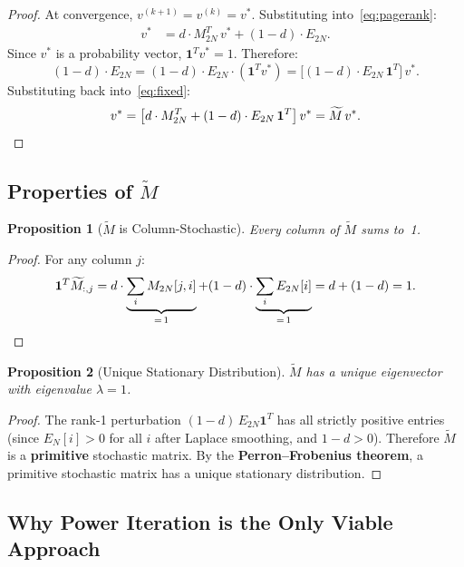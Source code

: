 \documentclass[12pt,a4paper]{article}
\theoremstyle{definition}
\theoremstyle{plain}
\newtheorem{proposition}{Proposition}[section]
\begin{document}
\begin{proof}
  At convergence, $v^{(k+1)} = v^{(k)} = v^*$. Substituting into~\eqref{eq:pagerank}:
  \begin{align}
    v^* &= d \cdot M_{2N}^T\,v^* + (1-d) \cdot E_{2N}. \label{eq:fixed}
  \end{align}
  Since $v^*$ is a probability vector, $\bm{1}^T v^* = 1$. Therefore:
  \[
    (1-d) \cdot E_{2N}
    = (1-d) \cdot E_{2N} \cdot (\bm{1}^T v^*)
    = \bigl[(1-d) \cdot E_{2N}\,\bm{1}^T\bigr]\,v^*.
  \]
  Substituting back into~\eqref{eq:fixed}:
  \[
    v^*
    = \bigl[d \cdot M_{2N}^T + (1-d) \cdot E_{2N}\,\bm{1}^T\bigr]\,v^*
    = \widetilde{M}\,v^*. \qedhere
  \]
\end{proof}

\subsection{Properties of $\widetilde{M}$}

\begin{proposition}[$\widetilde{M}$ is Column-Stochastic]
  \label{prop:stochastic}
  Every column of $\widetilde{M}$ sums to~1.
\end{proposition}

\begin{proof}
  For any column $j$:
  \[
    \bm{1}^T \widetilde{M}_{:,j}
    = d \cdot \underbrace{\sum_i M_{2N}[j,i]}_{=\,1}
    + (1-d) \cdot \underbrace{\sum_i E_{2N}[i]}_{=\,1}
    = d + (1-d) = 1. \qedhere
  \]
\end{proof}

\begin{proposition}[Unique Stationary Distribution]
  \label{prop:unique}
  $\widetilde{M}$ has a unique eigenvector with eigenvalue $\lambda = 1$.
\end{proposition}

\begin{proof}
  The rank-1 perturbation $(1-d)\,E_{2N}\bm{1}^T$ has all strictly positive entries
  (since $E_N[i] > 0$ for all $i$ after Laplace smoothing, and $1-d > 0$). Therefore
  $\widetilde{M}$ is a \textbf{primitive} stochastic matrix. By the
  \textbf{Perron--Frobenius theorem}, a primitive stochastic matrix has a unique
  stationary distribution. \qedhere
\end{proof}

\subsection{Why Power Iteration is the Only Viable Approach}
\end{document}
